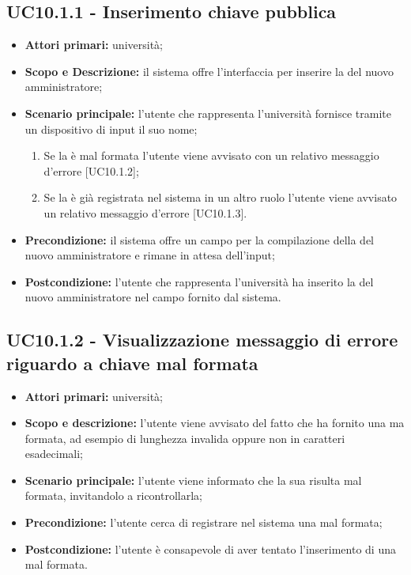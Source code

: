 \documentclass[AnalisiDeiRequisiti.tex]{subfiles}
\begin{document}
\subsection{UC10.1.1 - Inserimento chiave pubblica}
\begin{itemize}
	\item \textbf{Attori primari:} università;
	\item \textbf{Scopo e Descrizione:} il sistema offre l'interfaccia per inserire la  del nuovo amministratore;
	\item \textbf{Scenario principale:} l'utente che rappresenta l'università fornisce tramite un dispositivo di input il suo nome;	\begin{enumerate}
		\item Se la  è mal formata l'utente viene avvisato con un relativo messaggio d'errore [UC10.1.2];
		\item Se la  è già registrata nel sistema in un altro ruolo l'utente viene avvisato un relativo messaggio d'errore [UC10.1.3].
	\end{enumerate}
	\item \textbf{Precondizione:} il sistema offre un campo per la compilazione della  del nuovo amministratore e rimane in attesa dell'input;
	\item \textbf{Postcondizione:} l'utente che rappresenta l'università ha inserito la  del nuovo amministratore nel campo fornito dal sistema.
\end{itemize}
\subsection{UC10.1.2 - Visualizzazione messaggio di errore riguardo a chiave mal formata}
\begin{itemize}
	\item \textbf{Attori primari:} università;
	\item \textbf{Scopo e descrizione:} l'utente viene avvisato del fatto che ha fornito una  ma formata, ad esempio di lunghezza invalida oppure non in caratteri esadecimali;
	\item \textbf{Scenario principale:} l'utente viene informato che la sua  risulta mal formata, invitandolo a ricontrollarla;
	\item \textbf{Precondizione:} l'utente cerca di registrare nel sistema una  mal formata;
	\item \textbf{Postcondizione:} l'utente è consapevole di aver tentato l'inserimento di una  mal formata.
\end{itemize}
\end{document}
